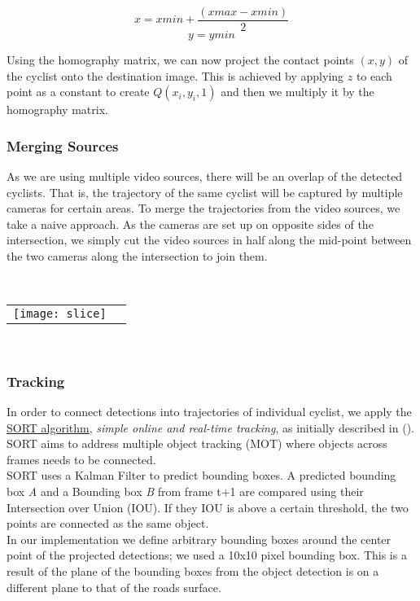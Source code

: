 $$x = xmin + \frac{(xmax - xmin)}{2}$$
$$y = ymin$$

Using the homography matrix, we can now project the contact points $(x, y)$ of the cyclist onto the destination
image. This is achieved by applying $z$ to each point as a constant to create $Q(x_i, y_i, 1)$ and then we multiply it by the homography matrix. 

\subsubsection{Merging Sources}
As we are using multiple video sources, there will be an overlap of the detected cyclists. 
That is, the trajectory of the same cyclist will be captured by multiple cameras for certain areas. 
To merge the trajectories from the video sources, we take a naive approach. As the cameras are set up on
opposite sides of the intersection, we simply cut the video sources in half along the mid-point between
the two cameras along the intersection to join them.

\ \\ 
\noindent
\begin{tabular}{@{}cc}
\texttt{[image: slice]} 
\end{tabular}
\label{slice}
\


\subsubsection{Tracking}

In order to connect detections into trajectories of individual cyclist, we apply 
the \href{https://github.com/abewley/sort}{SORT algorithm}, \textit{simple online and real-time tracking}, as initially described in (\cite{Bewley2016_sort}). 
SORT aims to address multiple object tracking (MOT) where objects across frames needs to be connected. 
\ \\ 
SORT uses a Kalman Filter to predict bounding boxes. A predicted bounding box \textit{A} and a Bounding box \textit{B} from 
frame t+1 are compared using their Intersection over Union (IOU). If they IOU is above a certain threshold, the two points are connected as the same object.
\ \\
In our implementation we define arbitrary bounding boxes around the center point of the projected detections; 
we used a 10x10 pixel bounding box. This is a result of the plane of the bounding boxes from the object detection is on
a different plane to that of the roads surface.

